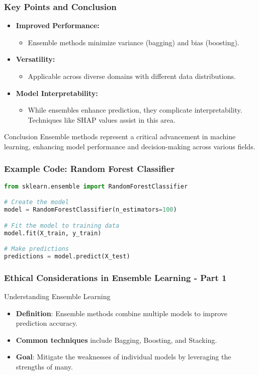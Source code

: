 \documentclass[aspectratio=169]{beamer}
\begin{document}
\begin{frame}[fragile]
  \frametitle{Key Points and Conclusion}
  \begin{itemize}
    \item \textbf{Improved Performance:} 
      \begin{itemize}
        \item Ensemble methods minimize variance (bagging) and bias (boosting).
      \end{itemize}
    \item \textbf{Versatility:} 
      \begin{itemize}
        \item Applicable across diverse domains with different data distributions.
      \end{itemize}
    \item \textbf{Model Interpretability:} 
      \begin{itemize}
        \item While ensembles enhance prediction, they complicate interpretability. Techniques like SHAP values assist in this area.
      \end{itemize}
  \end{itemize}

  \begin{block}{Conclusion}
    Ensemble methods represent a critical advancement in machine learning, enhancing model performance and decision-making across various fields.
  \end{block}
\end{frame}

\begin{frame}[fragile]
  \frametitle{Example Code: Random Forest Classifier}
  \begin{lstlisting}[language=Python]
from sklearn.ensemble import RandomForestClassifier

# Create the model
model = RandomForestClassifier(n_estimators=100)

# Fit the model to training data
model.fit(X_train, y_train)

# Make predictions
predictions = model.predict(X_test)
  \end{lstlisting}
\end{frame}

\begin{frame}[fragile]
    \frametitle{Ethical Considerations in Ensemble Learning - Part 1}
    \begin{block}{Understanding Ensemble Learning}
        \begin{itemize}
            \item \textbf{Definition}: Ensemble methods combine multiple models to improve prediction accuracy.
            \item \textbf{Common techniques} include Bagging, Boosting, and Stacking.
            \item \textbf{Goal}: Mitigate the weaknesses of individual models by leveraging the strengths of many.
        \end{itemize}
    \end{block}
\end{frame}
\end{document}
